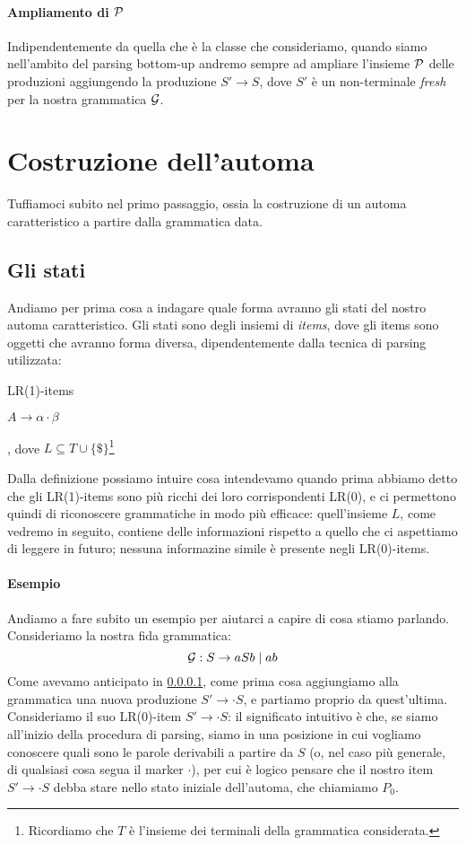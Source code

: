 \documentclass[class=book, crop=false, oneside, 12pt]{standalone}
\begin{document}
\paragraph{Ampliamento di \(\P\)}
\label{par:p-newprod}
 Indipendentemente da quella che è la classe che consideriamo, quando siamo nell'ambito del parsing bottom-up andremo sempre ad ampliare l'insieme \(\P\) delle produzioni aggiungendo la produzione \(S' \to S\), dove \(S'\) è un non-terminale \emph{fresh} per la nostra grammatica \(\G\).

\section{Costruzione dell'automa}
Tuffiamoci subito nel primo passaggio, ossia la costruzione di un automa caratteristico a partire dalla grammatica data.

\subsection{Gli stati}
Andiamo per prima cosa a indagare quale forma avranno gli stati del nostro automa caratteristico. Gli stati sono degli insiemi di \emph{items}, dove gli items sono oggetti che avranno forma diversa, dipendentemente dalla tecnica di parsing utilizzata:
\begin{labeling}{LR(1)-items}
    \item[LR(0)-items] \(A \to \alpha \cdot \beta\)
    \item[LR(1)-items] [\(A \to \alpha \cdot \beta, L\)], dove \(L \subseteq T \cup \{\$\}\)\footnote{Ricordiamo che \(T\) è l'insieme dei terminali della grammatica considerata.}
\end{labeling}
Dalla definizione possiamo intuire cosa intendevamo quando prima abbiamo detto che gli LR(1)-items sono più ricchi dei loro corrispondenti LR(0), e ci permettono quindi di riconoscere grammatiche in modo più efficace: quell'insieme \(L\), come vedremo in seguito, contiene delle informazioni rispetto a quello che ci aspettiamo di leggere in futuro; nessuna informazine simile è presente negli LR(0)-items.

\paragraph{Esempio}
Andiamo a fare subito un esempio per aiutarci a capire di cosa stiamo parlando. Consideriamo la nostra fida grammatica:
\begin{equation}
    \label{eq:balanced}
    \G: S \to aSb \mid ab
\end{equation}
Come avevamo anticipato in \ref{par:p-newprod}, come prima cosa aggiungiamo alla grammatica una nuova produzione \(S' \to \cdot S\), e partiamo proprio da quest'ultima. Consideriamo il suo LR(0)-item \(S' \to \cdot S\): il significato intuitivo è che, se siamo all'inizio della procedura di parsing, siamo in una posizione in cui vogliamo conoscere quali sono le parole derivabili a partire da \(S\) (o, nel caso più generale, di qualsiasi cosa segua il marker \(\cdot\)), per cui è logico pensare che il nostro item \(S' \to \cdot S\) debba stare nello stato iniziale dell'automa, che chiamiamo \(P_0\).
\end{document}
